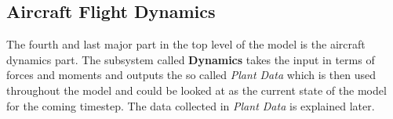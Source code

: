 \subsection{Aircraft Flight Dynamics}

The fourth and last major part in the top level of the model is the aircraft dynamics part. The subsystem called \textbf{Dynamics} takes the input in terms of forces and moments and outputs the so called \textit{Plant Data} which is then used throughout the model and could be looked at as the current state of the model for the coming timestep. The data collected in \textit{Plant Data} is explained later.

